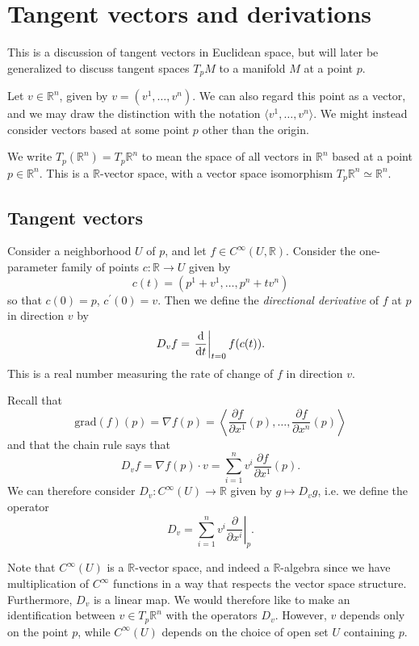\section{Tangent vectors and derivations}

This is a discussion of tangent vectors in Euclidean space, but will
later be generalized to discuss tangent spaces $T_p M$ to a manifold
$M$ at a point $p$.

Let $v \in \mathbb{R}^n$, given by $v = (v^1, \dots, v^n)$. We can
also regard this point as a vector, and we may draw the distinction
with the notation $\langle v^1, \dots, v^n \rangle$. We might instead
consider vectors based at some point $p$ other than the origin.

We write $T_p(\mathbb{R}^n) = T_p \mathbb{R}^n$ to mean the space of
all vectors in $\mathbb{R}^n$ based at a point $p \in
\mathbb{R}^n$. This is a $\mathbb{R}$-vector space, with a vector
space isomorphism $T_p \mathbb{R}^n \simeq \mathbb{R}^n$.

\subsection{Tangent vectors}

\begin{defn}
Consider a neighborhood $U$ of $p$, and let $f \in
C^\infty(U, \mathbb{R})$. Consider the one-parameter family of points
$c: \mathbb{R} \to U$ given by
$$
  c(t)
= (p^1 + v^1, \dots, p^n + t v^n)
$$
so that $c(0) = p$, $c^\prime(0) = v$. Then we define the
\emph{directional derivative} of $f$ at $p$ in direction $v$ by
$$
  D_v f
= \left.
    \frac{\mathop{}\!\mathrm{d}}{\mathop{}\!\mathrm{d} t}
  \right|_{t = 0}
    f(c(t)).
$$
This is a real number measuring the rate of change of $f$ in direction
$v$.
\end{defn}


Recall that
$$
  \mathrm{grad}(f)(p)
= \nabla f(p)
= \left\langle
    \frac{\partial f}
         {\partial x^1}(p),
    \dots,
    \frac{\partial f}
         {\partial x^n}(p)
  \right\rangle
$$
and that the chain rule says that
$$
  D_v f
= \nabla f(p) \cdot v
= \sum_{i=1}^n
    v^i
    \frac{\partial f}
         {\partial x^1}(p).
$$
We can therefore consider
$D_v : C^\infty(U) \to \mathbb{R}$
given by $g \mapsto D_v g$, i.e. we define the operator
$$
  D_v
= \sum_{i=1}^n
    v^i
    \left.
      \frac{\partial}
           {\partial x^i}
    \right|_p.
$$

Note that $C^\infty(U)$ is a $\mathbb{R}$-vector space, and indeed a
$\mathbb{R}$-algebra since we have multiplication of $C^\infty$
functions in a way that respects the vector space
structure. Furthermore, $D_v$ is a linear map. We would therefore like
to make an identification between $v \in T_p \mathbb{R}^n$ with the
operators $D_v$. However, $v$ depends only on the point $p$, while
$C^\infty(U)$ depends on the choice of open set $U$ containing $p$.

